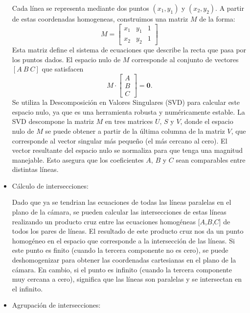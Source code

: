 \begin{itemize}
    Cada línea se representa mediante dos puntos \((x_1, y_1)\) y \((x_2, y_2)\). A partir de estas coordenadas homogeneas, construimos una matriz \(M\) de la forma:
    \[
        M = \begin{bmatrix}
                x_1 & y_1 & 1 \\
                x_2 & y_2 & 1
        \end{bmatrix}
    \]
    Esta matriz define el sistema de ecuaciones que describe la recta que pasa por los puntos dados.
    El espacio nulo de \(M\) corresponde al conjunto de vectores \([\!A\!~\!B\!~\!C\!]\) que satisfacen
    \[
        M \cdot \begin{bmatrix}
                    A \\ B \\ C
        \end{bmatrix} = \mathbf{0}.
    \]
    Se utiliza la Descomposición en Valores Singulares (SVD) para calcular este espacio nulo, ya que es una herramienta robusta y numéricamente estable.
    La SVD descompone la matriz \(M\) en tres matrices \(U\), \(S\) y \(V\), donde el espacio nulo de \(M\)
    se puede obtener a partir de la última columna de la matriz \(V\), que corresponde al vector singular más pequeño (el más cercano al cero).
    El vector resultante del espacio nulo se normaliza para que tenga una magnitud manejable.
    Esto asegura que los coeficientes \(A\), \(B\) y \(C\) sean comparables entre distintas líneas.

    \item Cálculo de intersecciones:

    Dado que ya se tendrian las ecuaciones de todas las líneas paralelas en el plano de la cámara,
    se pueden calcular las intersecciones de estas líneas realizando un producto cruz entre las
    ecuaciones homogéneas [\(A\),\(B\),\(C\)] de todos los pares de líneas.
    El resultado de este producto cruz nos da un punto homogéneo en el espacio que corresponde a la intersección de las líneas.
    Si este punto es finito (cuando la tercera componente no es cero), se puede deshomogenizar para obtener las coordenadas
    cartesianas en el plano de la cámara.
    En cambio, si el punto es infinito (cuando la tercera componente muy cercana a cero), significa que las líneas son paralelas y se intersectan en el infinito.


    \item  Agrupación de intersecciones:


\end{itemize}
